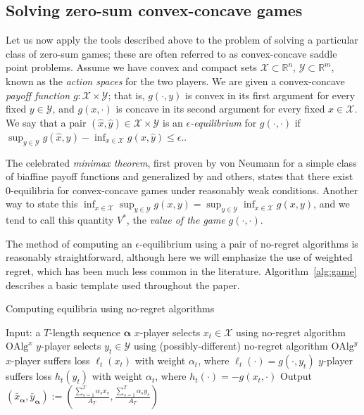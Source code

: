 \documentclass[final,12pt]{colt2018} %
\def\reals{\mathbb{R}}
\def\g{\gamma_{\K}}
\def\reals{\mathbb{R}}
\def\K{\mathcal{K}}
\def\balpha{\boldsymbol{\alpha}}
\def\alg{\text{OAlg}}
\newcommand{\XX}{\mathcal{X}}
\newcommand{\YY}{\mathcal{Y}}
\begin{document}



\subsection{Solving zero-sum convex-concave games}

Let us now apply the tools described above to the problem of solving a particular class of zero-sum games; these are often referred to as convex-concave saddle point problems. Assume we have convex and compact sets $\XX \subset \reals^n$, $\YY \subset \reals^m$, known as the \emph{action spaces} for the two players. We are given a convex-concave \emph{payoff function} $g: \XX \times \YY$; that is, $g(\cdot, y)$ is convex in its first argument for every fixed $y \in \YY$, and $g(x,\cdot)$ is concave in its second argument for every fixed $x \in \XX$. We say that a pair $(\hat x, \hat y) \in \XX\times \YY$ is an \emph{$\epsilon$-equilibrium} for $g(\cdot, \cdot)$ if $\sup_{y \in \YY} g(\hat x, y) - \inf_{x \in \XX} g(x, \hat y) \leq \epsilon.$.

The celebrated \emph{minimax theorem}, first proven by von Neumann for a simple class of biaffine payoff functions \citep{v1928theorie,neumann1944theory} and generalized by \citet{sion1958general} and others, states that there exist 0-equilibria for convex-concave games under reasonably weak conditions. Another way to state this $\inf_{x \in \XX} \sup_{y \in \YY} g(x, y) =  \sup_{y \in \YY}\inf_{x \in \XX} g(x, y)$, and we tend to call this quantity $V^*$, the \emph{value of the game} $g(\cdot, \cdot)$.

The method of computing an $\epsilon$-equilibrium using a pair of no-regret algorithms is reasonably straightforward, although here we will emphasize the use of weighted regret, which has been much less common in the literature. Algorithm~\ref{alg:game} describes a basic template used throughout the paper. 
\begin{algorithm}[h] 
   \caption{ Computing equilibria using no-regret algorithms } \label{alg:game}
\begin{algorithmic}[1]
\STATE Input: a $T$-length sequence $\balpha$
\STATE $x$-player selects $x_t \in \XX$ using no-regret algorithm $\alg^x$
\STATE $y$-player selects $y_t\in \YY$ using (possibly-different) no-regret algorithm $\alg^y$
\STATE $x$-player suffers loss $\ell_{t}(x_t)$ with weight $\alpha_t$, where $\ell_t(\cdot) = g(\cdot,y_t)$
\STATE $y$-player suffers loss $h_{t}(y_t)$ with weight $\alpha_t$, where $h_t(\cdot) = -g(x_t,\cdot)$
\ENDFOR
\STATE Output $(\bar{x}_{\balpha},\bar{y}_{\balpha}) := \left(\frac{ \sum_{s=1}^T \alpha_s x_s  }{ A_T }, \frac{ \sum_{s=1}^T \alpha_s y_s  }{ A_T }\right)$
\end{algorithmic}
\end{algorithm}
\end{document}
